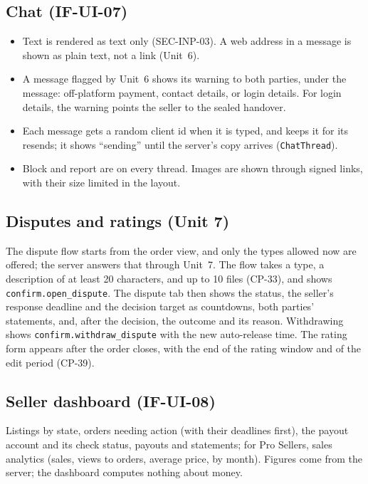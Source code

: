 \documentclass[11pt,a4paper]{article}
\begin{document}
\subsection{Chat (IF-UI-07)}
\begin{itemize}[nosep]
  \item Text is rendered as text only (SEC-INP-03). A web address in a message is shown as plain text, not a link (Unit~6).
  \item A message flagged by Unit~6 shows its warning to both parties, under the message: off-platform payment, contact details, or login details. For login details, the warning points the seller to the sealed handover.
  \item Each message gets a random client id when it is typed, and keeps it for its resends; it shows ``sending'' until the server's copy arrives (\texttt{ChatThread}).
  \item Block and report are on every thread. Images are shown through signed links, with their size limited in the layout.
\end{itemize}

\subsection{Disputes and ratings (Unit 7)}
The dispute flow starts from the order view, and only the types allowed now are offered; the server answers that through Unit~7. The flow takes a type, a description of at least 20 characters, and up to 10 files (CP-33), and shows \texttt{confirm.open\_dispute}. The dispute tab then shows the status, the seller's response deadline and the decision target as countdowns, both parties' statements, and, after the decision, the outcome and its reason. Withdrawing shows \texttt{confirm.withdraw\_dispute} with the new auto-release time. The rating form appears after the order closes, with the end of the rating window and of the edit period (CP-39).

\subsection{Seller dashboard (IF-UI-08)}
Listings by state, orders needing action (with their deadlines first), the payout account and its check status, payouts and statements; for Pro Sellers, sales analytics (sales, views to orders, average price, by month). Figures come from the server; the dashboard computes nothing about money.
\end{document}
